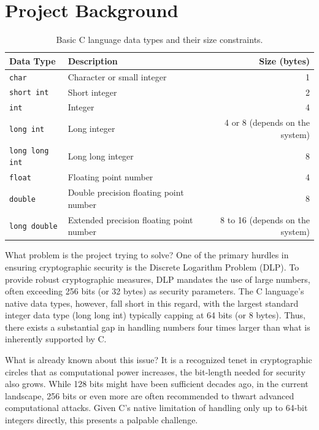 \documentclass[12pt,a4paper]{article}
\begin{document}
	\section{Project Background}
	\begin{table}[h!]
		\centering
		\begin{tabularx}{\textwidth}{lXr}
			\toprule
			\textbf{Data Type} & \textbf{Description} & \textbf{Size (bytes)} \\
			\midrule
			\texttt{char} & Character or small integer & 1 \\
			\texttt{short int} & Short integer & 2 \\
			\texttt{int} & Integer & 4 \\
			\texttt{long int} & Long integer & 4 or 8 (depends on the system) \\
			\texttt{long long int} & Long long integer & 8 \\
			\texttt{float} & Floating point number & 4 \\
			\texttt{double} & Double precision floating point number & 8 \\
			\texttt{long double} & Extended precision floating point number & 8 to 16 (depends on the system) \\
			\bottomrule
		\end{tabularx}
		\caption{Basic C language data types and their size constraints.}
		\label{tab:c_data_types}
	\end{table}
	
	What problem is the project trying to solve?
	One of the primary hurdles in ensuring cryptographic security is the Discrete Logarithm Problem (DLP). To provide robust cryptographic measures, DLP mandates the use of large numbers, often exceeding 256 bits (or 32 bytes) as security parameters. The C language's native data types, however, fall short in this regard, with the largest standard integer data type (long long int) typically capping at 64 bits (or 8 bytes). Thus, there exists a substantial gap in handling numbers four times larger than what is inherently supported by C.
	
	What is already known about this issue?
	It is a recognized tenet in cryptographic circles that as computational power increases, the bit-length needed for security also grows. While 128 bits might have been sufficient decades ago, in the current landscape, 256 bits or even more are often recommended to thwart advanced computational attacks. Given C's native limitation of handling only up to 64-bit integers directly, this presents a palpable challenge.
	
\end{document}
